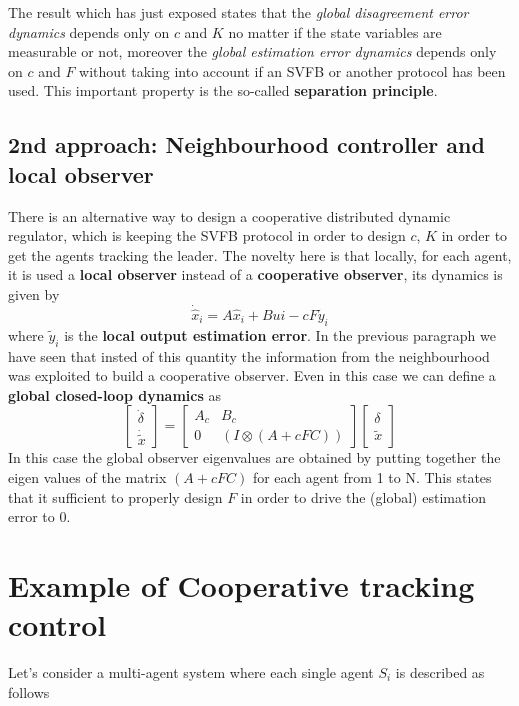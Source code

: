 The result which has just exposed states that the \textit{global disagreement error dynamics} depends only on $c$ and $K$ no matter if the state variables are measurable or not, moreover the \textit{global estimation error dynamics} depends only on $c$ and $F$ without taking into account if an SVFB or another protocol has been used. This important property is the so-called \textbf{separation principle}.

\subsection{\color{red}2nd approach: Neighbourhood controller and local observer}
There is an alternative way to design a cooperative distributed dynamic regulator, which is keeping the SVFB protocol in order to design $c$, $K$ in order to get the agents tracking the leader. The novelty here is that locally, for each agent, it is used a \textbf{local observer} instead of a \textbf{cooperative observer}, its dynamics is given by
\begin{equation*}
    \dot{\hat{x}}_i = A \hat{x}_i + B ui - cF\tilde{y}_i
\end{equation*}
where $\tilde{y}_i$ is the \textbf{local output estimation error}. In the previous paragraph we have seen that insted of this quantity the information from the neighbourhood was exploited to build a cooperative observer.
Even in this case we can define a \textbf{global closed-loop  dynamics} as
{\large{
    \begin{equation*}
        \begin{bmatrix}
            \dot{\delta}\\
            \dot{\tilde{x}}
        \end{bmatrix} = \begin{bmatrix}
            A_c& B_c\\
            0&(I \otimes (A+cFC))
        \end{bmatrix} \begin{bmatrix}
            \delta\\
            \tilde{x}
        \end{bmatrix}
    \end{equation*}
}}
In this case the global observer eigenvalues are obtained by putting together the eigen values of the matrix $(A+cFC)$ for each agent from 1 to N. This states that it sufficient to properly design $F$ in order to drive the (global) estimation error to 0. 


\section{Example of Cooperative tracking control }
\noindent
Let's consider a multi-agent system where each single agent $S_i$ is described as follows 

